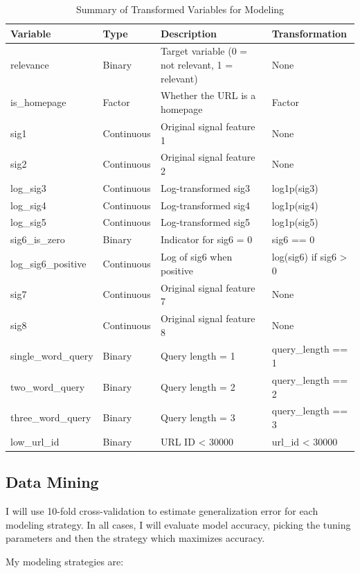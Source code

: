 \documentclass[
]{article}
\begin{document}
\begin{longtabu} to 
\caption{\label{tab:unnamed-chunk-9}Summary of Transformed Variables for Modeling}\\
\toprule
Variable & Type & Description & Transformation\\
\midrule
relevance & Binary & Target variable (0 = not relevant, 1 = relevant) & None\\
is\_homepage & Factor & Whether the URL is a homepage & Factor\\
sig1 & Continuous & Original signal feature 1 & None\\
sig2 & Continuous & Original signal feature 2 & None\\
log\_sig3 & Continuous & Log-transformed sig3 & log1p(sig3)\\
\addlinespace
log\_sig4 & Continuous & Log-transformed sig4 & log1p(sig4)\\
log\_sig5 & Continuous & Log-transformed sig5 & log1p(sig5)\\
sig6\_is\_zero & Binary & Indicator for sig6 = 0 & sig6 == 0\\
log\_sig6\_positive & Continuous & Log of sig6 when positive & log(sig6) if sig6 > 0\\
sig7 & Continuous & Original signal feature 7 & None\\
\addlinespace
sig8 & Continuous & Original signal feature 8 & None\\
single\_word\_query & Binary & Query length = 1 & query\_length == 1\\
two\_word\_query & Binary & Query length = 2 & query\_length == 2\\
three\_word\_query & Binary & Query length = 3 & query\_length == 3\\
low\_url\_id & Binary & URL ID < 30000 & url\_id < 30000\\
\bottomrule
\end{longtabu}

\subsection{Data Mining}\label{data-mining}

I will use 10-fold cross-validation to estimate generalization error for
each modeling strategy. In all cases, I will evaluate model accuracy,
picking the tuning parameters and then the strategy which maximizes
accuracy.

My modeling strategies are:
\end{document}
